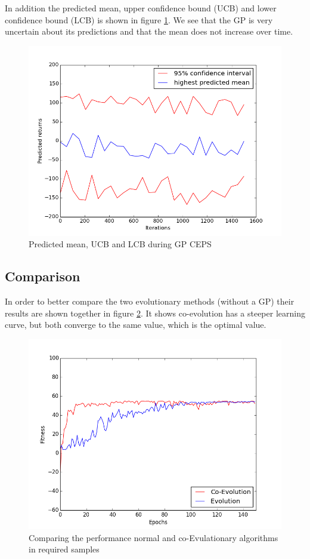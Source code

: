 In addition the predicted mean, upper confidence bound (UCB) and lower confidence bound (LCB) is shown in figure \ref{pred_img}. We see that the GP is very uncertain about its predictions and that the mean does not increase over time.

\begin{figure}[ht]
  \centering
  \includegraphics[scale=0.5]{images/GPCEPS_pred.png}
  \caption{Predicted mean, UCB and LCB during GP CEPS}\label{pred_img}
\end{figure}


\subsection{Comparison}\label{comparisonSection}
In order to better compare the two evolutionary methods (without a GP) their results are shown together in figure \ref{compare_img}. It shows co-evolution has a steeper learning curve, but both converge to the same value, which is the optimal value.

\begin{figure}[ht]
  \centering
  \includegraphics[scale=0.5]{images/together.png}
  \caption{Comparing the performance normal and co-Evulationary algorithms in required samples}\label{compare_img}
\end{figure}


